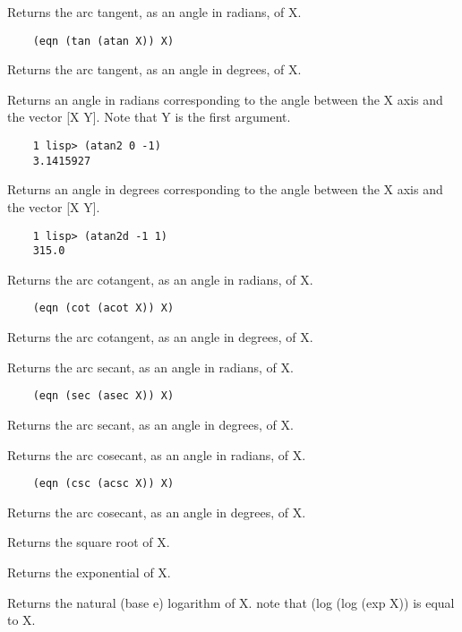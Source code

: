 {    Returns the arc tangent, as an angle in radians, of X.  }
\begin{verbatim}
    (eqn (tan (atan X)) X)
\end{verbatim}
{    Returns the arc tangent, as an angle in degrees, of X.  }

{    Returns  an  angle  in  radians  corresponding  to the angle
    between the X axis and the vector [X Y].  Note that Y is the
    first argument.
}
\begin{verbatim}
    1 lisp> (atan2 0 -1)
    3.1415927
\end{verbatim}
{    Returns an angle  in  degrees  corresponding  to  the  angle
    between the X axis and the vector [X Y].
}
\begin{verbatim}
    1 lisp> (atan2d -1 1)
    315.0
\end{verbatim}
{    Returns the arc cotangent, as an angle in radians, of X.  }
\begin{verbatim}
    (eqn (cot (acot X)) X)
\end{verbatim}

{    Returns the arc cotangent, as an angle in degrees, of X.  }

{    Returns the arc secant, as an angle in radians, of X.  }
\begin{verbatim}
    (eqn (sec (asec X)) X)
\end{verbatim}
{    Returns the arc secant, as an angle in degrees, of X.  }

{    Returns the arc cosecant, as an angle in radians, of X.  }
\begin{verbatim}
    (eqn (csc (acsc X)) X)
\end{verbatim}
{    Returns the arc cosecant, as an angle in degrees, of X.  }

{    Returns the square root of X.  }

{    Returns the exponential of X.  }

{    Returns the natural (base e) logarithm of X.  note that (log
    (log (exp X)) is equal to X.  }

